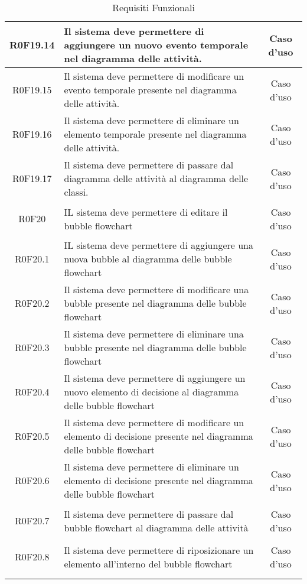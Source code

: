 \documentclass[../AnalisiDeiRequisiti.tex]{subfiles}
\begin{document}
\begin{longtable}{|c|>{\centering}p{7cm}|c|}
	\hypertarget{R0F19.14}{R0F19.14} & Il sistema deve permettere di aggiungere un nuovo evento temporale nel diagramma delle attività. & Caso d'uso \\ \hline
	\hypertarget{R0F19.15}{R0F19.15} & Il sistema deve permettere di modificare un evento temporale presente nel diagramma delle attività. & Caso d'uso \\ \hline
	\hypertarget{R0F19.16}{R0F19.16} & Il sistema deve permettere di eliminare un elemento temporale presente nel diagramma delle attività. & Caso d'uso \\ \hline
	\hypertarget{R0F19.17}{R0F19.17} & Il sistema deve permettere di passare dal diagramma delle attività al diagramma delle classi. & Caso d'uso \\ \hline
	\hypertarget{R0F20}{R0F20} & IL sistema deve permettere di editare il bubble flowchart & Caso d'uso \\ \hline
	\hypertarget{R0F20.1}{R0F20.1} & IL sistema deve permettere di aggiungere una nuova bubble al diagramma delle bubble flowchart & Caso d'uso \\ \hline
	\hypertarget{R0F20.2}{R0F20.2} & Il sistema deve permettere di modificare una bubble presente nel diagramma delle bubble flowchart & Caso d'uso \\ \hline
	\hypertarget{R0F20.3}{R0F20.3} & Il sistema deve permettere di eliminare una bubble presente nel diagramma delle bubble flowchart & Caso d'uso \\ \hline
	\hypertarget{R0F20.4}{R0F20.4} & Il sistema deve permettere di aggiungere un nuovo elemento di decisione al diagramma delle bubble flowchart & Caso d'uso \\ \hline
	\hypertarget{R0F20.5}{R0F20.5} & Il sistema deve permettere di modificare un elemento di decisione presente nel diagramma delle bubble flowchart & Caso d'uso \\ \hline
	\hypertarget{R0F20.6}{R0F20.6} & Il sistema deve permettere di eliminare un elemento di decisione presente nel diagramma delle bubble flowchart & Caso d'uso \\ \hline
	\hypertarget{R0F20.7}{R0F20.7} & Il sistema deve permettere di passare dal bubble flowchart al diagramma delle attività & Caso d'uso \\ \hline
	\hypertarget{R0F20.8}{R0F20.8} & Il sistema deve permettere di riposizionare un elemento all'interno del bubble flowchart & Caso d'uso \\ \hline
	\caption[Requisiti Funzionali]{Requisiti Funzionali}
	\label{tabella:req0}
\end{longtable}
\clearpage
\end{document}
